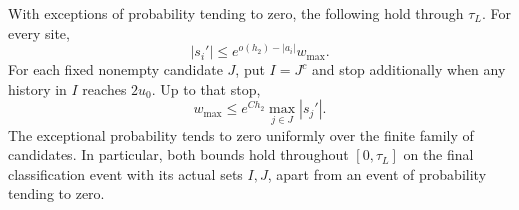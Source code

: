 \begin{lemma}\label{sign:derivative-bounds}
With exceptions of probability tending to zero, the following hold
through \(\tau_L\).  For every site,
\begin{equation}\label{sign:site-suppression}
 |s_i'|\le e^{o(h_2)-|a_i|}w_{\max}.
\end{equation}
For each fixed nonempty candidate \(J\), put \(I=J^c\) and stop
additionally when any history in \(I\) reaches \(2u_0\).  Up to
that stop,
\begin{equation}\label{sign:deep-controls-all}
 w_{\max}\le e^{Ch_2}\max_{j\in J}|s_j'|.
\end{equation}
The exceptional probability tends to zero uniformly over the finite
family of candidates.  In particular, both bounds hold throughout
\([0,\tau_L]\) on the final classification event with its actual
sets \(I,J\), apart from an event of probability tending to zero.
\end{lemma}

